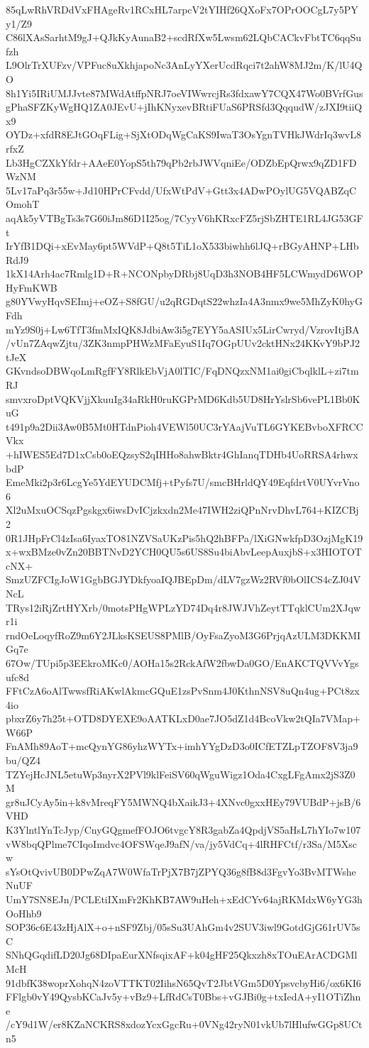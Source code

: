 85qLwRhVRDdVxFHAgeRv1RCxHL7arpcV2tYIHf26QXoFx7OPrOOCgL7y5PYy1/Z9
C86lXAsSarhtM9gJ+QJkKyAunaB2+scdRfXw5Lwsm62LQbCACkvFbtTC6qqSufzh
L9OlrTrXUFzv/VPFuc8uXkhjapoNc3AnLyYXerUcdRqci7t2ahW8MJ2m/K/lU4QO
8h1Yi5IRiUMJJvte87MWdAtffpNRJ7oeVIWwrcjRs3fdxawY7CQX47Wo0BVrfGus
gPhaSFZKyWgHQ1ZA0JEvU+jIhKNyxevBRtiFUaS6PRSfd3QqqudW/zJXI9tiiQx9
OYDz+xfdR8EJtGOqFLig+SjXtODqWgCaKS9IwaT3OsYgnTVHkJWdrIq3wvL8rfxZ
Lb3HgCZXkYfdr+AAeE0YopS5th79qPb2rbJWVqniEe/ODZbEpQrwx9qZD1FDWzNM
5Lv17aPq3r55w+Jd10HPrCFvdd/UfxWtPdV+Gtt3x4ADwPOylUG5VQABZqCOmohT
aqAk5yVTBgTs3s7G60iJm86D1I25og/7CyyV6hKRxcFZ5rjSbZHTE1RL4JG53GFt
IrYfB1DQi+xEvMay6pt5WVdP+Q8t5TiL1oX533biwhh6lJQ+rBGyAHNP+LHbRdJ9
1kX14Arh4ac7Rmlg1D+R+NCONpbyDRbj8UqD3h3NOB4HF5LCWmydD6WOPHyFmKWB
g80YVwyHqvSEImj+eOZ+S8fGU/u2qRGDqtS22whzIa4A3nmx9we5MhZyK0hyGFdh
mYz9S0j+Lw6TfT3fmMxIQK8JdbiAw3i5g7EYY5aASIUx5LirCwryd/VzrovItjBA
/vUn7ZAqwZjtu/3ZK3nmpPHWzMFaEyuS1Iq7OGpUUv2cktHNx24KKvY9bPJ2tJeX
GKvndsoDBWqoLmRgfFY8RlkEbVjA0lTIC/FqDNQzxNM1ai0giCbqlklL+zi7tmRJ
smvxroDptVQKVjjXkuuIg34aRkH0ruKGPrMD6Kdb5UD8HrYslrSb6vePL1Bb0KuG
t491p9a2Dii3Aw0B5Mt0HTdnPioh4VEWl50UC3rYAajVuTL6GYKEBvboXFRCCVkx
+hIWES5Ed7D1xCsb0oEQzsyS2qIHHo8ahwBktr4GhIanqTDHb4UoRRSA4rhwxbdP
EmeMki2p3r6LcgYe5YdEYUDCMfj+tPyfs7U/smcBHrldQY49EqfdrtV0UYvrVno6
Xl2uMxuOCSqzPgskgx6iwsDvICjzkxdn2Me47IWH2ziQPnNrvDhvL764+KIZCBj2
0R1JHpFrCl4zIsa6IyaxTO81NZVSaUKzPis5hQ2hBFPa/lXiGNwkfpD3OzjMgK19
x+wxBMze0vZn20BBTNvD2YCH0QU5s6US8Su4biAbvLeepAuxjbS+x3HIOTOTcNX+
SmzUZFCIgJoW1GgbBGJYDkfyoaIQJBEpDm/dLV7gzWz2RVf0bOlICS4cZJ04VNcL
TRys12iRjZrtHYXrb/0motsPHgWPLzYD74Dq4r8JWJVhZeytTTqklCUm2XJqwr1i
rndOeLoqyfRoZ9m6Y2JLksKSEUS8PMlB/OyFsaZyoM3G6PrjqAzULM3DKKMIGq7e
67Ow/TUpi5p3EEkroMKc0/AOHa15s2RckAfW2fbwDa0GO/EnAKCTQVVvYgsufc8d
FFtCzA6oAlTwwsfRiAKwlAkmcGQuE1zsPvSnm4J0KthnNSV8uQn4ug+PCt8zx4io
pbxrZ6y7h25t+OTD8DYEXE9oAATKLxD0ae7JO5dZ1d4BcoVkw2tQIa7VMap+W66P
FnAMh89AoT+mcQynYG86yhzWYTx+imhYYgDzD3o0ICfETZLpTZOF8V3ja9bu/QZ4
TZYejHcJNL5etuWp3nyrX2PVl9klFeiSV60qWguWigz1Oda4CxgLFgAmx2jS3Z0M
gr8uJCyAy5in+k8vMreqFY5MWNQ4bXaikJ3+4XNvc0gxxHEy79VUBdP+jsB/6VHD
K3YlntlYnTcJyp/CnyGQgmefFOJO6tvgcY8R3gabZa4QpdjVS5aHsL7hYIo7w107
vW8bqQPlme7CIqoImdvc4OFSWqeJ9afN/va/jy5VdCq+4lRHFCtf/r3Sa/M5Xscw
sYsOtQvivUB0DPwZqA7W0WfaTrPjX7B7jZPYQ36g8fB8d3FgvYo3BvMTWsheNuUF
UmY7SN8EJn/PCLEtiIXmFr2KhKB7AW9uHeh+xEdCYv64ajRKMdxW6yYG3hOoHhb9
SOP36c6E43zHjAlX+o+nSF9Zbj/05sSu3UAhGm4v2SUV3iwl9GotdGjG61rUV5sC
SNhQGqdifLD20Jg68DIpaEurXNfsqixAF+k04gHF25Qkxzh8xTOuEArACDGMlMcH
91dbfK38woprXohqN4zoVTTKT02IihsN65QvT2JbtVGm5D0YpsvcbyHi6/ox6KI6
FFlgb0vY49QysbKCaJv5y+vBz9+LfRdCsT0Bbs+vGJBi0g+txIedA+yI1OTiZhne
/cY9d1W/er8KZaNCKRS8xdozYcxGgcRu+0VNg42ryN01vkUb7lHlufwGGp8UCtn5
